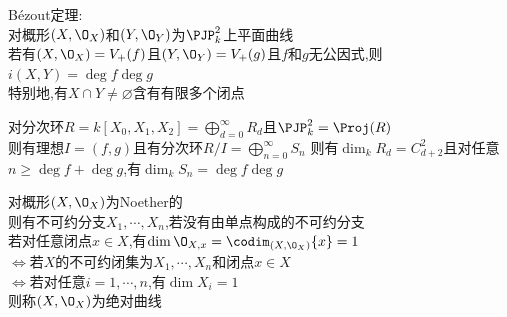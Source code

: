 \begin{dingli}
Bézout定理:\\
对概形$(X,\O_{X})$和$(Y,\O_{Y})$为$\PJP_{k}^{2}$上平面曲线\\
若有$(X,\O_{X})=V_{+}(f)$且$(Y,\O_{Y})=V_{+}(g)$且$f$和$g$无公因式,则$i(X,Y)=\deg f\deg g$\\
特别地,有$X\cap Y\neq \varnothing$含有有限多个闭点
\end{dingli}

\begin{zhu}
对分次环$R=k[X_0,X_1,X_2]=\bigoplus\limits_{d=0}^{\infty}R_{d}$且$\PJP_{k}^{2}=\Proj(R)$\\
则有理想$I=(f,g)$且有分次环$R/I=\bigoplus\limits_{n=0}^{\infty}S_{n}$
则有$\dim_{k}R_{d}=C_{d+2}^{2}$且对任意$n\geq\deg f+\deg g$,有$\dim_{k}S_{n}=\deg f\deg g$
\end{zhu}

\begin{dingyi}
对概形$(X,\O_{X})$为Noether的\\
则有不可约分支$X_1,\cdots,X_n$,若没有由单点构成的不可约分支\\
若对任意闭点$x\in X$,有$\dim \O_{X,x}=\codim_{(X,\O_{X})}\{x\}=1$\\
$\Leftrightarrow$若$X$的不可约闭集为$X_1,\cdots,X_n$和闭点$x\in X$\\
$\Leftrightarrow$若对任意$i=1,\cdots,n$,有$\dim X_i=1$\\
则称$(X,\O_{X})$为绝对曲线
\end{dingyi}

%